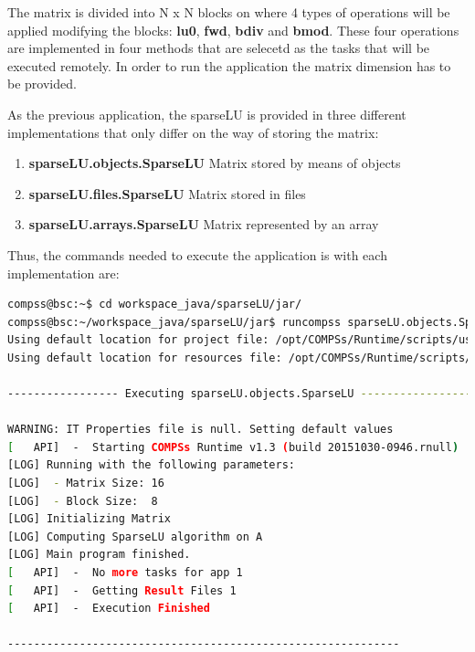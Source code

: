 The matrix is divided into N x N blocks on where 4 types of operations will be applied modifying the blocks: 
{\bf lu0}, {\bf fwd}, {\bf bdiv} and {\bf bmod}. These four operations are implemented in four methods that 
are selecetd as the tasks that will be executed remotely. In order to run the application the matrix dimension 
has to be provided.

As the previous application, the sparseLU is provided in three different implementations that only differ on the way of storing
the matrix:
\begin{enumerate}
 \item \textbf{sparseLU.objects.SparseLU} Matrix stored by means of objects
 \item \textbf{sparseLU.files.SparseLU} Matrix stored in files
 \item \textbf{sparseLU.arrays.SparseLU} Matrix represented by an array
\end{enumerate}

Thus, the commands needed to execute the application is with each implementation are:

\begin{lstlisting}[language=bash]
compss@bsc:~$ cd workspace_java/sparseLU/jar/
compss@bsc:~/workspace_java/sparseLU/jar$ runcompss sparseLU.objects.SparseLU 16 8
Using default location for project file: /opt/COMPSs/Runtime/scripts/user/../../configuration/xml/projects/project.xml
Using default location for resources file: /opt/COMPSs/Runtime/scripts/user/../../configuration/xml/resources/resources.xml

----------------- Executing sparseLU.objects.SparseLU --------------------------

WARNING: IT Properties file is null. Setting default values
[   API]  -  Starting COMPSs Runtime v1.3 (build 20151030-0946.rnull)
[LOG] Running with the following parameters:
[LOG]  - Matrix Size: 16
[LOG]  - Block Size:  8
[LOG] Initializing Matrix
[LOG] Computing SparseLU algorithm on A
[LOG] Main program finished.
[   API]  -  No more tasks for app 1
[   API]  -  Getting Result Files 1
[   API]  -  Execution Finished

------------------------------------------------------------
\end{lstlisting}

